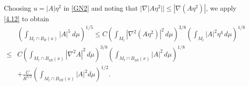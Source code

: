 \documentclass{amsart}
\theoremstyle{definition}
\numberwithin{equation}{section}
\begin{document}
 Choosing $u=|A|\eta^2$ in \eqref{GN2} and noting that $|\nabla |A \eta^2||\leq |\nabla (A\eta^2)|$, we apply  \eqref{4.12}  to obtain
\begin{align}\label{5.19}
 & \left ( \int_{  M_t\cap B_{R}(x)}   |A|^{5}\  d\mu\right )^{1/5}\leq C \left ( \int_{M_t}  |\nabla^2 (A\eta^2 )|^2 \,d\mu \right )^{3/8} \left
 ( \int_{M_t}  | A|^2 \eta^4 \,d\mu \right )^{1/8} \\
  \leq& C \left ( \int_{  M_t\cap B_{2R}(x)}  |\nabla^2 A|^2 \,d\mu
 \right )^{3/8}\left ( \int_{  M_t\cap B_{2R}(x)}  | A|^2  \,d\mu\right )^{1/8}\nonumber\\
 &+ \frac C{R^{3/2}}\left ( \int_{  M_t\cap B_{2R}(x)} \left| A \right|^{2} d\mu \right )^{1/2}. \nonumber
\end{align}
\end{document}
